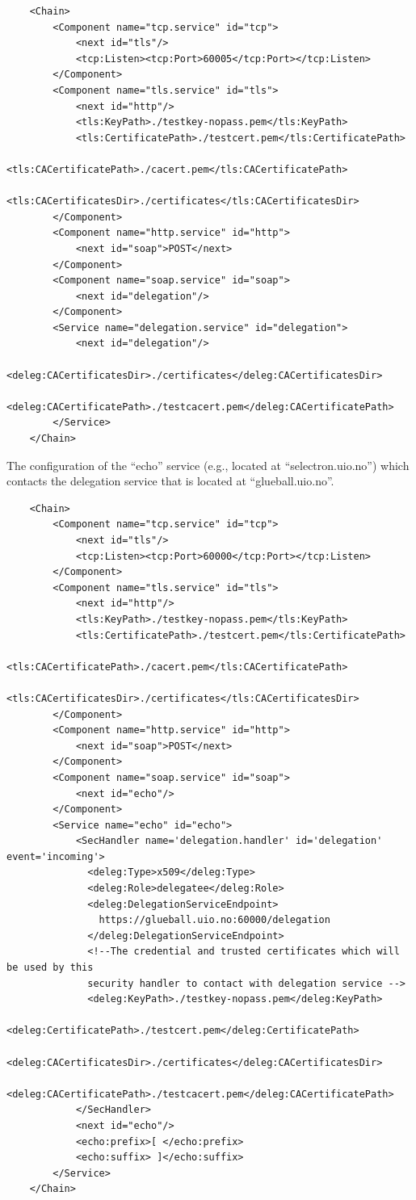 \documentclass{article}                            %
\begin{document}
\begin{verbatim}
    <Chain>
        <Component name="tcp.service" id="tcp">
            <next id="tls"/>
            <tcp:Listen><tcp:Port>60005</tcp:Port></tcp:Listen>
        </Component>
        <Component name="tls.service" id="tls">
            <next id="http"/>
            <tls:KeyPath>./testkey-nopass.pem</tls:KeyPath>
            <tls:CertificatePath>./testcert.pem</tls:CertificatePath>
            <tls:CACertificatePath>./cacert.pem</tls:CACertificatePath>
              <tls:CACertificatesDir>./certificates</tls:CACertificatesDir>
        </Component>
        <Component name="http.service" id="http">
            <next id="soap">POST</next>
        </Component>
        <Component name="soap.service" id="soap">
            <next id="delegation"/>
        </Component>
        <Service name="delegation.service" id="delegation">
            <next id="delegation"/>
            <deleg:CACertificatesDir>./certificates</deleg:CACertificatesDir>
            <deleg:CACertificatePath>./testcacert.pem</deleg:CACertificatePath>
        </Service>
    </Chain>
\end{verbatim}

The configuration of the ``echo'' service (e.g., located at ``selectron.uio.no'') which contacts the delegation service that is located at ``glueball.uio.no''.

\begin{verbatim}
    <Chain>
        <Component name="tcp.service" id="tcp">
            <next id="tls"/>
            <tcp:Listen><tcp:Port>60000</tcp:Port></tcp:Listen>
        </Component>
        <Component name="tls.service" id="tls">
            <next id="http"/>
            <tls:KeyPath>./testkey-nopass.pem</tls:KeyPath>
            <tls:CertificatePath>./testcert.pem</tls:CertificatePath>
            <tls:CACertificatePath>./cacert.pem</tls:CACertificatePath>
              <tls:CACertificatesDir>./certificates</tls:CACertificatesDir>
        </Component>
        <Component name="http.service" id="http">
            <next id="soap">POST</next>
        </Component>
        <Component name="soap.service" id="soap">
            <next id="echo"/>
        </Component>
        <Service name="echo" id="echo">
            <SecHandler name='delegation.handler' id='delegation' event='incoming'>
              <deleg:Type>x509</deleg:Type>
              <deleg:Role>delegatee</deleg:Role>
              <deleg:DelegationServiceEndpoint>
                https://glueball.uio.no:60000/delegation
              </deleg:DelegationServiceEndpoint>
              <!--The credential and trusted certificates which will be used by this
              security handler to contact with delegation service -->
              <deleg:KeyPath>./testkey-nopass.pem</deleg:KeyPath>
              <deleg:CertificatePath>./testcert.pem</deleg:CertificatePath>
              <deleg:CACertificatesDir>./certificates</deleg:CACertificatesDir>
              <deleg:CACertificatePath>./testcacert.pem</deleg:CACertificatePath>
            </SecHandler>
            <next id="echo"/>
            <echo:prefix>[ </echo:prefix>
            <echo:suffix> ]</echo:suffix>
        </Service>
    </Chain>
\end{verbatim}
\end{document}
